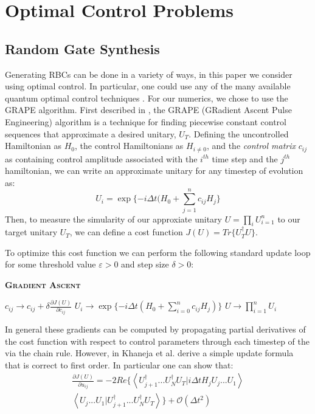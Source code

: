 \documentclass[aps,nofootinbib,pra,notitlepage,twocolumn]{revtex4-1}
\newcommand{\braket}[2]{\left\langle #1 | #2 \right\rangle}
\begin{document}
\section{Optimal Control Problems}\label{ocp}
\subsection{Random Gate Synthesis}
 Generating RBCs can be done in a variety of ways, in this paper we consider using optimal control. In particular, one could use any of the many available quantum optimal control techniques \cite{Khaneja2005, Caneva2011, Machnes2018}. For our numerics, we chose to use the GRAPE algorithm. First described in \cite{Khaneja2005}, the GRAPE (GRadient Ascent Pulse Engineering) algorithm is a technique for finding piecewise constant control sequences that approximate a desired unitary, $U_T$. Defining the uncontrolled Hamiltonian as $H_0$, the control Hamiltonians as $H_{i\neq 0}$, and the \textit{control matrix} $c_{ij}$ as containing control amplitude associated with the $i^{th}$ time step and the $j^{th}$ hamiltonian, we can write an approximate unitary for any timestep of evolution as:
\begin{equation}\label{eq:3}
  U_i = \exp\{-i\Delta t(H_0 + \sum_{j=1}^{n}c_{ij}H_{j}\}
\end{equation}
Then, to measure the simularity of our approxiate unitary $U=\prod_iU_{i=1}^n$ to our target unitary $U_T$, we can define a cost function $J(U) = Tr\{U_T^{\dagger}U\}$.

To optimize this cost function we can perform the following standard update loop for some threshold value $\varepsilon > 0$ and step size $\delta > 0$:
\begin{algorithm}[H]
  \caption{\textsc{\textbf{Gradient Ascent}}}
  \begin{algorithmic}
    \State $c_{ij} \rightarrow c_{ij} + \delta\frac{\partial J(U)}{\partial c_{ij}}$
    \State $U_i \rightarrow \exp\{-i\Delta t(H_0 + \sum_{i=0}^{n}c_{ij}H_j)\}$
    \EndFor
    \State $U \rightarrow \prod_{i=1}^nU_i$
    \EndWhile
  \end{algorithmic}
\end{algorithm}

In general these gradients can be computed by propagating partial derivatives of the cost function with respect to control parameters through each timestep of the  via the chain rule. However, in \cite{Khaneja2005} Khaneja et al. derive a simple update formula that is correct to first order. In particular one can show that:
\begin{equation}\label{eq:update}
  \begin{split}
\frac{\partial J(U)}{\partial u_{ij}} = -2Re\{\braket{{U_{j+1}^{\dagger}...U_N^{\dagger} U_T}}{i\Delta tH_jU_j...U_1}\\
\braket{U_j...U_1}{U_{j+1}^{\dagger}...U_N^{\dagger} U_T}\} +  \mathcal{O}(\Delta t^2)
  \end{split}
\end{equation}
\end{document}
